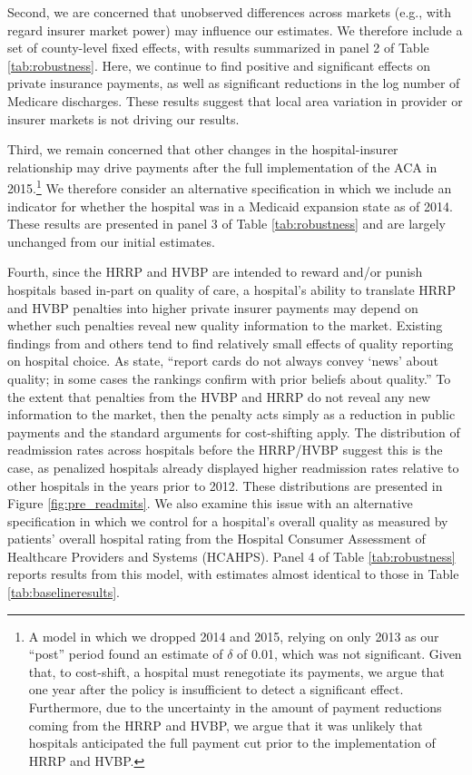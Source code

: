 \documentclass[12pt]{article}
\begin{document}
Second, we are concerned that unobserved differences across markets (e.g., with regard insurer market power) may influence our estimates. We therefore include a set of county-level fixed effects, with results summarized in panel 2 of Table \ref{tab:robustness}. Here, we continue to find positive and significant effects on private insurance payments, as well as significant reductions in the log number of Medicare discharges. These results suggest that local area variation in provider or insurer markets is not driving our results.

Third, we remain concerned that other changes in the hospital-insurer relationship may drive payments after the full implementation of the ACA in 2015.\footnote{A model in which we dropped 2014 and 2015, relying on only 2013 as our ``post'' period found an estimate of $\delta$ of 0.01, which was not significant.  Given that, to cost-shift, a hospital must renegotiate its payments, we argue that one year after the policy is insufficient to detect a significant effect.  Furthermore, due to the uncertainty in the amount of payment reductions coming from the HRRP and HVBP, we argue that it was unlikely that hospitals anticipated the full payment cut prior to the implementation of HRRP and HVBP.} We therefore consider an alternative specification in which we include an indicator for whether the hospital was in a Medicaid expansion state as of 2014. These results are presented in panel 3 of Table \ref{tab:robustness} and are largely unchanged from our initial estimates.

Fourth, since the HRRP and HVBP are intended to reward and/or punish hospitals based in-part on quality of care, a hospital's ability to translate HRRP and HVBP penalties into higher private insurer payments may depend on whether such penalties reveal new quality information to the market. Existing findings from \cite{dranove2008} and others tend to find relatively small effects of quality reporting on hospital choice. As \cite{dranove2008} state, ``report cards do not always convey `news' about quality; in some cases the rankings confirm with prior beliefs about quality.'' To the extent that penalties from the HVBP and HRRP do not reveal any new information to the market, then the penalty acts simply as a reduction in public payments and the standard arguments for cost-shifting apply. The distribution of readmission rates across hospitals before the HRRP/HVBP suggest this is the case, as penalized hospitals already displayed higher readmission rates relative to other hospitals in the years prior to 2012. These distributions are presented in Figure \ref{fig:pre_readmits}. We also examine this issue with an alternative specification in which we control for a hospital's overall quality as measured by patients' overall hospital rating from the Hospital Consumer Assessment of Healthcare Providers and Systems (HCAHPS).  Panel 4 of Table \ref{tab:robustness} reports results from this model, with estimates almost identical to those in Table \ref{tab:baselineresults}.
\end{document}
